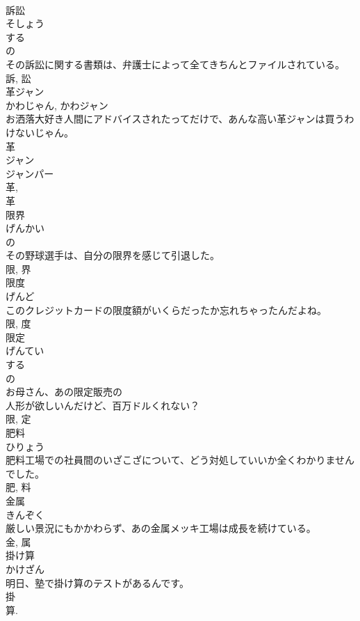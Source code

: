 \documentclass[8pt]{extreport}
\begin{document}
\begin{CJK}{UTF8}{min}
\\	訴訟	
\\	そしょう	
\\	する 
\\	の 
\\	その訴訟に関する書類は、弁護士によって全てきちんとファイルされている。	
\\	訴, 訟	
\\	革ジャン	
\\	かわじゃん, かわジャン	
\\	お洒落大好き人間にアドバイスされたってだけで、あんな高い革ジャンは買うわけないじゃん。	
\\	革 
\\	ジャン 
\\	ジャンパー 
\\	革, 
\\	革	
\\	限界	
\\	げんかい	
\\	の 
\\	その野球選手は、自分の限界を感じて引退した。	
\\	限, 界	
\\	限度	
\\	げんど	
\\	このクレジットカードの限度額がいくらだったか忘れちゃったんだよね。	
\\	限, 度	
\\	限定	
\\	げんてい	
\\	する 
\\	の 
\\	お母さん、あの限定販売の
\\	人形が欲しいんだけど、百万ドルくれない？	
\\	限, 定	
\\	肥料	
\\	ひりょう	
\\	肥料工場での社員間のいざこざについて、どう対処していいか全くわかりませんでした。	
\\	肥, 料	
\\	金属	
\\	きんぞく	
\\	厳しい景況にもかかわらず、あの金属メッキ工場は成長を続けている。	
\\	金, 属	
\\	掛け算	
\\	かけざん	
\\	明日、塾で掛け算のテストがあるんです。	
\\	掛 
\\	算. 

\end{CJK}
\end{document}
